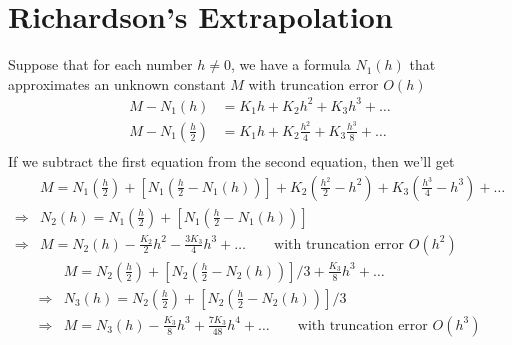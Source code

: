 \section{Richardson's Extrapolation}
Suppose that for each number $h\neq 0$, we have a formula $N_1(h)$ that approximates an unknown constant $M$ with truncation error $O(h)$
\begin{align*}
    M-N_1(h) &= K_1h+K_2h^2+K_3h^3+\ldots \\
    M-N_1\left(\frac{h}{2}\right) &= K_1h+K_2\frac{h^2}{4}+K_3\frac{h^3}{8}+\ldots \\
\end{align*}
If we subtract the first equation from the second equation, then we'll get
\begin{align*}
    & M=N_1\left(\frac{h}{2}\right)+\left[N_1\left(\frac{h}{2}-N_1(h)\right)\right] + K_2\left(\frac{h^2}{2}-h^2\right) + K_3\left(\frac{h^3}{4}-h^3\right) + \ldots \\
    \Rightarrow & N_2(h) = N_1\left(\frac{h}{2}\right) + \left[N_1\left(\frac{h}{2}-N_1(h)\right)\right] \\
    \Rightarrow & M = N_2(h) - \frac{K_2}{2}h^2 - \frac{3K_3}{4}h^3 + \ldots \qquad \text{with truncation error $O(h^2)$}
\end{align*}
\begin{align*}
    & M=N_2\left(\frac{h}{2}\right)+\left[N_2\left(\frac{h}{2}-N_2(h)\right)\right]/3 + \frac{K_3}{8}h^3 + \ldots \\
    \Rightarrow & N_3(h) = N_2\left(\frac{h}{2}\right) + \left[N_2\left(\frac{h}{2}-N_2(h)\right)\right]/3 \\
    \Rightarrow & M = N_3(h) - \frac{K_3}{8}h^3 + \frac{7K_3}{48}h^4 + \ldots \qquad \text{with truncation error $O(h^3)$}
\end{align*}
